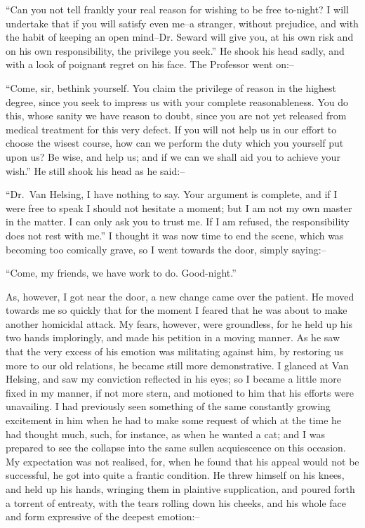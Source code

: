\documentclass[12pt,openright]{book}
\begin{document}
“Can you not tell frankly your real reason for wishing to be free to-night? I will undertake that if you will satisfy even me–a stranger, without prejudice, and with the habit of keeping an open mind–Dr. Seward will give you, at his own risk and on his own responsibility, the privilege you seek.” He shook his head sadly, and with a look of poignant regret on his face. The Professor went on:–

“Come, sir, bethink yourself. You claim the privilege of reason in the highest degree, since you seek to impress us with your complete reasonableness. You do this, whose sanity we have reason to doubt, since you are not yet released from medical treatment for this very defect. If you will not help us in our effort to choose the wisest course, how can we perform the duty which you yourself put upon us? Be wise, and help us; and if we can we shall aid you to achieve your wish.” He still shook his head as he said:–

“Dr. Van Helsing, I have nothing to say. Your argument is complete, and if I were free to speak I should not hesitate a moment; but I am not my own master in the matter. I can only ask you to trust me. If I am refused, the responsibility does not rest with me.” I thought it was now time to end the scene, which was becoming too comically grave, so I went towards the door, simply saying:–

“Come, my friends, we have work to do. Good-night.”

As, however, I got near the door, a new change came over the patient. He moved towards me so quickly that for the moment I feared that he was about to make another homicidal attack. My fears, however, were groundless, for he held up his two hands imploringly, and made his petition in a moving manner. As he saw that the very excess of his emotion was militating against him, by restoring us more to our old relations, he became still more demonstrative. I glanced at Van Helsing, and saw my conviction reflected in his eyes; so I became a little more fixed in my manner, if not more stern, and motioned to him that his efforts were unavailing. I had previously seen something of the same constantly growing excitement in him when he had to make some request of which at the time he had thought much, such, for instance, as when he wanted a cat; and I was prepared to see the collapse into the same sullen acquiescence on this occasion. My expectation was not realised, for, when he found that his appeal would not be successful, he got into quite a frantic condition. He threw himself on his knees, and held up his hands, wringing them in plaintive supplication, and poured forth a torrent of entreaty, with the tears rolling down his cheeks, and his whole face and form expressive of the deepest emotion:–
\end{document}
